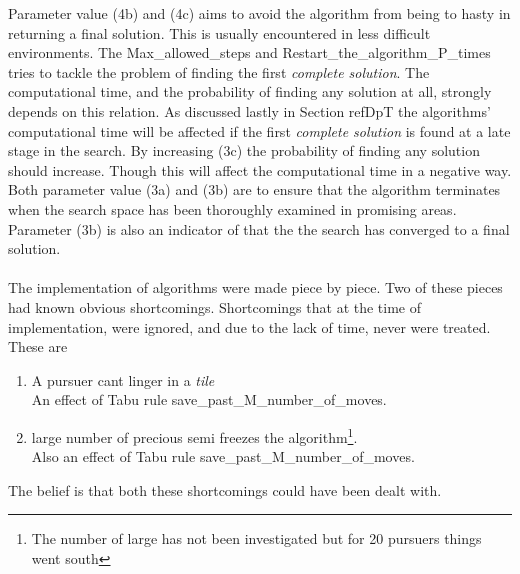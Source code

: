 Parameter value (4b) and (4c) aims to avoid the algorithm from being to hasty in returning a final solution. This is usually encountered in less difficult environments. The Max\_allowed\_steps and Restart\_the\_algorithm\_P\_times tries to tackle the problem of finding the first \emph{complete solution}. The computational time, and the probability of finding any solution at all, strongly depends on this relation. As discussed lastly in Section ref{DpT} the algorithms' computational time will be affected if the first \emph{complete solution} is found at a late stage in the search. By increasing (3c) the probability of finding any solution should increase. Though this will affect the computational time in a negative way. Both parameter value (3a) and (3b) are to ensure that the algorithm terminates when the search space has been thoroughly examined in promising areas.
Parameter (3b) is also an indicator of that the the search has converged to a final solution.\\
\\
The implementation of algorithms were made piece by piece. Two of these pieces had known obvious shortcomings. Shortcomings that at the time of implementation, were ignored, and due to the lack of time, never were treated. These are\\
\begin{enumerate}
\item{} A pursuer cant linger in a \emph{tile} \vspace{0,1cm}\\
 An effect of Tabu rule save\_past\_M\_number\_of\_moves.
\item{} large number of precious semi freezes the algorithm\footnote{ The number of large has not been investigated but for 20 pursuers things went south }. \vspace{0,1cm}\\
Also an effect of Tabu rule save\_past\_M\_number\_of\_moves.
\end{enumerate} 
The belief is that both these shortcomings could have been dealt with.

